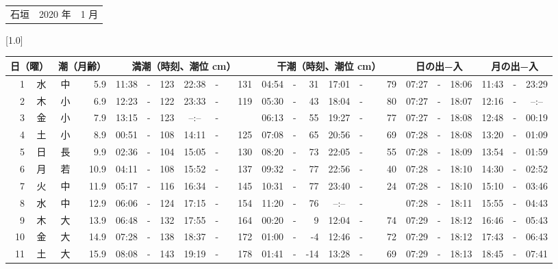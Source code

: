 \documentclass[12pt,a4j]{jsarticle}
\begin{document}
 \begin{table}[htbp]
 \begin{center}
 \begin{tabular}{lcc}
 \LARGE{石垣}  & \large{2020 年} & \large{ 1 月} \\
 \end{tabular}
 \end{center}
 \begin{center}
    \scalebox{0.7}[1.0]{
    \begin{tabular}{|rc|cr|ccrccr|ccrccr|ccc|ccc|}
    \hline
    \multicolumn{2}{|c|}{日（曜）} & \multicolumn{2}{c|}{潮（月齢）} & \multicolumn{6}{c|}{満潮（時刻、潮位 cm）} & \multicolumn{6}{c|}{干潮（時刻、潮位 cm）} & \multicolumn{3}{c|}{日の出−入} &  \multicolumn{3}{c|}{月の出−入}\\
 \hline
 1 & 水 & 中 &  5.9 &  11:38 &-& 123 &  22:38 &-& 131 &  04:54 &-&  31 &  17:01 &-&  79 & 07:27 & -& 18:06 & 11:43 & -& 23:29 \\
 2 & 木 & 小 &  6.9 &  12:23 &-& 122 &  23:33 &-& 119 &  05:30 &-&  43 &  18:04 &-&  80 & 07:27 & -& 18:07 & 12:16 & -& --:-- \\
 3 & 金 & 小 &  7.9 &  13:15 &-& 123 &  --:-- &-&~~~~~ &  06:13 &-&  55 &  19:27 &-&  77 & 07:27 & -& 18:08 & 12:48 & -& 00:19 \\
 4 & 土 & 小 &  8.9 &  00:51 &-& 108 &  14:11 &-& 125 &  07:08 &-&  65 &  20:56 &-&  69 & 07:28 & -& 18:08 & 13:20 & -& 01:09 \\
 5 & 日 & 長 &  9.9 &  02:36 &-& 104 &  15:05 &-& 130 &  08:20 &-&  73 &  22:05 &-&  55 & 07:28 & -& 18:09 & 13:54 & -& 01:59 \\
 6 & 月 & 若 & 10.9 &  04:11 &-& 108 &  15:52 &-& 137 &  09:32 &-&  77 &  22:56 &-&  40 & 07:28 & -& 18:10 & 14:30 & -& 02:52 \\
 7 & 火 & 中 & 11.9 &  05:17 &-& 116 &  16:34 &-& 145 &  10:31 &-&  77 &  23:40 &-&  24 & 07:28 & -& 18:10 & 15:10 & -& 03:46 \\
 8 & 水 & 中 & 12.9 &  06:06 &-& 124 &  17:15 &-& 154 &  11:20 &-&  76 &  --:-- &-&~~~~~ & 07:28 & -& 18:11 & 15:55 & -& 04:43 \\
 9 & 木 & 大 & 13.9 &  06:48 &-& 132 &  17:55 &-& 164 &  00:20 &-&   9 &  12:04 &-&  74 & 07:29 & -& 18:12 & 16:46 & -& 05:43 \\
10 & 金 & 大 & 14.9 &  07:28 &-& 138 &  18:37 &-& 172 &  01:00 &-&  -4 &  12:46 &-&  72 & 07:29 & -& 18:12 & 17:43 & -& 06:43 \\
11 & 土 & 大 & 15.9 &  08:08 &-& 143 &  19:19 &-& 178 &  01:41 &-& -14 &  13:28 &-&  69 & 07:29 & -& 18:13 & 18:45 & -& 07:41 \\

\end{tabular}}
\end{center}
\end{table}
\end{document}
